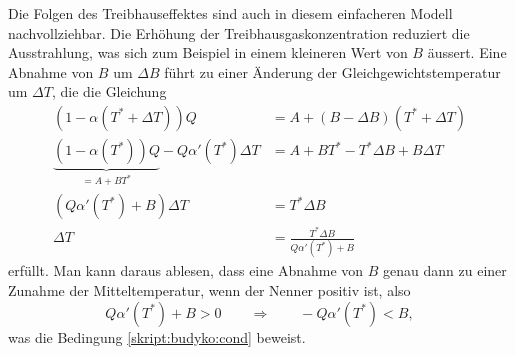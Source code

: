 Die Folgen des Treibhauseffektes sind auch in diesem einfacheren Modell
nachvollziehbar.
Die Erhöhung der Treibhausgaskonzentration reduziert die Ausstrahlung,
was sich zum Beispiel in einem kleineren Wert von $B$ äussert.
Eine Abnahme von $B$ um $\Delta B$ führt zu einer
Änderung der Gleichgewichtstemperatur um $\Delta T$, die die Gleichung
\begin{align*}
(1-\alpha(T^*+\Delta T))Q
&=
A + (B-\Delta B)(T^*+\Delta T)
\\
\underbrace{(1-\alpha(T^*))Q}_{\displaystyle=A+BT^*}
-Q\alpha'(T^*)\Delta T
&=
A+BT^*
- T^*\Delta B
+B\Delta T
\\
(Q\alpha'(T^*)
+
B)\Delta T
&=
T^*
\Delta B
\\
\Delta T
&=
\frac{T^*\Delta B}{Q\alpha'(T^*)+B}
\end{align*}
erfüllt.
Man kann daraus ablesen, dass eine Abnahme von $B$ genau dann zu einer
Zunahme der Mitteltemperatur, wenn der Nenner positiv ist, also
\[
Q\alpha'(T^*)+B > 0
\qquad\Rightarrow\qquad
-Q\alpha'(T^*)<B,
\]
was die Bedingung
\eqref{skript:budyko:cond}
beweist.




